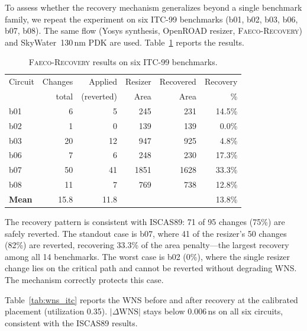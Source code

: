 \documentclass[journal]{IEEEtran}
\begin{document}
To assess whether the recovery mechanism generalizes beyond a single
benchmark family, we repeat the experiment on six ITC-99 benchmarks
(b01, b02, b03, b06, b07, b08). The same flow (Yosys synthesis,
OpenROAD resizer, \textsc{Faeco-Recovery}) and SkyWater~130\,nm PDK
are used. Table~\ref{tab:recovery_itc} reports the results.

\begin{table}[t]
\centering
\caption{\textsc{Faeco-Recovery} results on six ITC-99 benchmarks.}
\label{tab:recovery_itc}
\renewcommand{\arraystretch}{1.1}
\begin{tabular}{lrrrrr}
\toprule
Circuit & Changes & Applied & Resizer & Recovered & Recovery \\
        & total   & (reverted) & Area & Area & \% \\
\midrule
b01 &  6 &  5 &  245 &  231 & 14.5\% \\
b02 &  1 &  0 &  139 &  139 &  0.0\% \\
b03 & 20 & 12 &  947 &  925 &  4.8\% \\
b06 &  7 &  6 &  248 &  230 & 17.3\% \\
b07 & 50 & 41 & 1851 & 1628 & 33.3\% \\
b08 & 11 &  7 &  769 &  738 & 12.8\% \\
\midrule
\textbf{Mean} & 15.8 & 11.8 &  &  & 13.8\% \\
\bottomrule
\end{tabular}
\end{table}

The recovery pattern is consistent with ISCAS89: 71 of 95 changes (75\%)
are safely reverted. The standout case is b07, where 41 of the resizer's
50 changes (82\%) are reverted, recovering 33.3\% of the area penalty---the
largest recovery among all 14 benchmarks. The worst case is b02 (0\%),
where the single resizer change lies on the critical path and cannot be
reverted without degrading WNS. The mechanism correctly protects this case.

Table~\ref{tab:wns_itc} reports the WNS before and after recovery at
the calibrated placement (utilization 0.35). $|\Delta\text{WNS}|$ stays
below 0.006\,ns on all six circuits, consistent with the ISCAS89 results.
\end{document}
